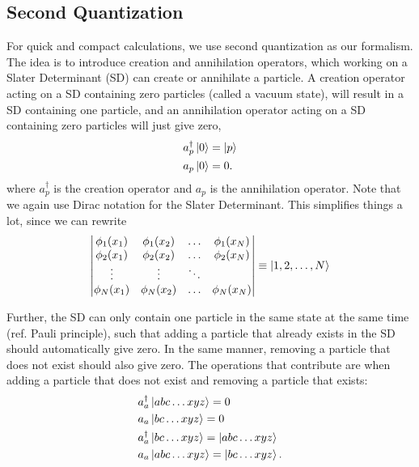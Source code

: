 \subsection{Second Quantization} \label{sec:SQ}
For quick and compact calculations, we use second quantization as our formalism. The idea is to introduce creation and annihilation operators, which working on a Slater Determinant (SD) can create or annihilate a particle. A creation operator acting on a SD containing zero particles (called a vacuum state), will result in a SD containing one particle, and an annihilation operator acting on a SD containing zero particles will just give zero,
\begin{align}
	a_{p}^{\dagger}\ket{0}&=\ket{p}\\
	a_{p}\ket{0}&=0.
\end{align}
where $a_p^{\dagger}$ is the creation operator and $a_p$ is the annihilation operator. Note that we again use Dirac notation for the Slater Determinant. This simplifies things a lot, since we can rewrite
\begin{equation}
\begin{vmatrix}
\phi_1(x_1) & \phi_1(x_2) & \hdots & \phi_1(x_N) \\
\phi_2(x_1) & \phi_2(x_2) & \hdots & \phi_2(x_N) \\
\vdots & \vdots & \ddots &\\
\phi_N(x_1) & \phi_N(x_2) & \hdots & \phi_N(x_N)
\end{vmatrix}
\equiv \ket{1,2,\hdots,N}
\end{equation}

Further, the SD can only contain one particle in the same state at the same time (ref. Pauli principle), such that adding a particle that already exists in the SD should automatically give zero. In the same manner, removing a particle that does not exist should also give zero. The operations that contribute are when adding a particle that does not exist and removing a particle that exists:
\begin{align}
	&a_{a}^{\dagger}\ket{abc\hdots xyz}=0\\
	&a_{a}\ket{bc\hdots xyz}=0\\
	&a_{a}^{\dagger}\ket{bc\hdots xyz}=\ket{abc\hdots xyz}\\
	&a_{a}\ket{abc\hdots xyz}=\ket{bc\hdots xyz}.
\end{align}

